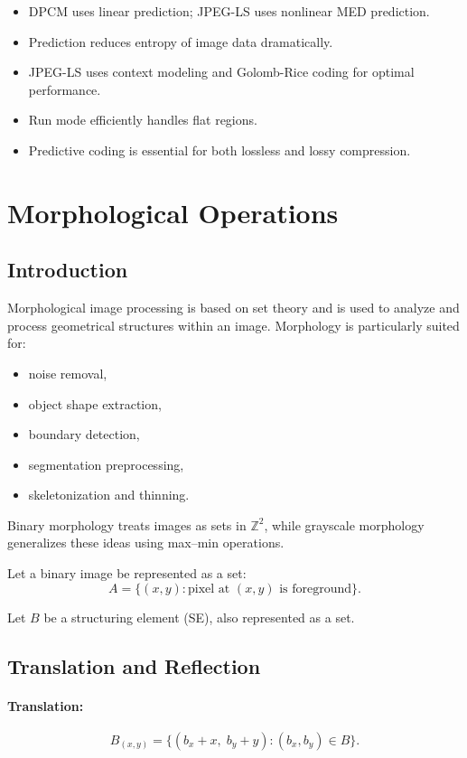 \documentclass{AnantDocumentation}
\begin{document}
\begin{itemize}
\item DPCM uses linear prediction; JPEG-LS uses nonlinear MED prediction.
\item Prediction reduces entropy of image data dramatically.
\item JPEG-LS uses context modeling and Golomb-Rice coding for optimal performance.
\item Run mode efficiently handles flat regions.
\item Predictive coding is essential for both lossless and lossy compression.
\end{itemize}

\section{Morphological Operations}

\subsection{Introduction}

Morphological image processing is based on set theory and is used to analyze and process geometrical structures within an image.  
Morphology is particularly suited for:

\begin{itemize}
\item noise removal,
\item object shape extraction,
\item boundary detection,
\item segmentation preprocessing,
\item skeletonization and thinning.
\end{itemize}

Binary morphology treats images as sets in $\mathbb{Z}^2$, while grayscale morphology generalizes these ideas using max–min operations.

Let a binary image be represented as a set:
\[
A = \{(x,y) : \text{pixel at } (x,y) \text{ is foreground}\}.
\]

Let $B$ be a structuring element (SE), also represented as a set.

\subsection{Translation and Reflection}

\paragraph{Translation:}
\[
B_{(x,y)} = \{(b_x + x,\; b_y + y) : (b_x, b_y) \in B\}.
\]
\end{document}
